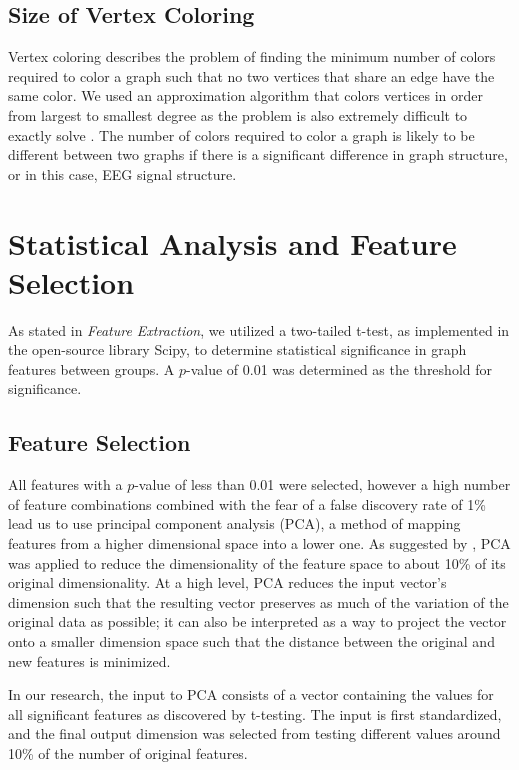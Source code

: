 \documentclass[Afour,times,sageh]{sagej}
\begin{document}
\subsection{Size of Vertex Coloring}
Vertex coloring describes the problem of finding the minimum number of colors required to color a graph such that no two vertices that share an edge have the same color. We used an approximation algorithm that colors vertices in order from largest to smallest degree as the problem is also extremely difficult to exactly solve \citep{Kosowski}. The number of colors required to color a graph is likely to be different between two graphs if there is a significant difference in graph structure, or in this case, EEG signal structure.
\section{Statistical Analysis and Feature Selection}
As stated in \textit{Feature Extraction}, we utilized a two-tailed t-test, as implemented in the open-source library Scipy, to determine statistical significance in graph features between groups. A $p$-value of 0.01 was determined as the threshold for significance.
\subsection{Feature Selection}
All features with a $p$-value of less than 0.01 were selected, however a high number of feature combinations combined with the fear of a false discovery rate of 1\% lead us to use principal component analysis (PCA), a method of mapping features from a higher dimensional space into a lower one. As suggested by \citet{Ahmadlou2010}, PCA was applied to reduce the dimensionality of the feature space to about 10\% of its original dimensionality. At a high level, PCA reduces the input vector's dimension such that the resulting vector preserves as much of the variation of the original data as possible; it can also be interpreted as a way to project the vector onto a smaller dimension space such that the distance between the original and new features is minimized.

In our research, the input to PCA consists of a vector containing the values for all significant features as discovered by t-testing. The input is first standardized, and the final output dimension was selected from testing different values around 10\% of the number of original features.
\end{document}
